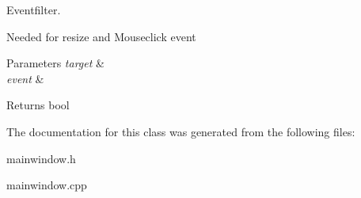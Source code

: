 Eventfilter. 

Needed for resize and Mouseclick event 
\begin{DoxyParams}{Parameters}
{\em target} & \\
\hline
{\em event} & \\
\hline
\end{DoxyParams}
\begin{DoxyReturn}{Returns}
bool 
\end{DoxyReturn}


The documentation for this class was generated from the following files\+:\begin{DoxyCompactItemize}
\item 
mainwindow.\+h\item 
mainwindow.\+cpp\end{DoxyCompactItemize}
